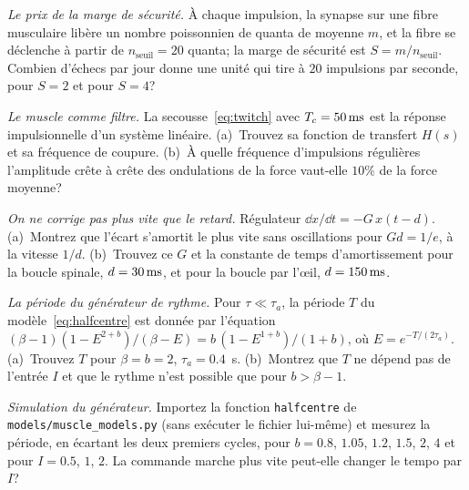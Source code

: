 \begin{exercise}[\lvlA]
\label{ex:13:2}
\emph{Le prix de la marge de sécurité.} À chaque impulsion, la synapse sur une fibre musculaire libère un nombre poissonnien de quanta de moyenne $m$, et la fibre se déclenche à partir de $n_{\text{seuil}}=20$ quanta; la marge de sécurité est $S=m/n_{\text{seuil}}$. Combien d'échecs par jour donne une unité qui tire à $20$ impulsions par seconde, pour $S=2$ et pour $S=4$?
\end{exercise}

\begin{exercise}[\lvlB]
\label{ex:13:3}
\emph{Le muscle comme filtre.} La secousse~\eqref{eq:twitch} avec $T_c=50\,\text{ms}$ est la réponse impulsionnelle d'un système linéaire. (a)~Trouvez sa fonction de transfert $H(s)$ et sa fréquence de coupure. (b)~À quelle fréquence d'impulsions régulières l'amplitude crête à crête des ondulations de la force vaut-elle $10\%$ de la force moyenne?
\end{exercise}

\begin{exercise}[\lvlB]
\label{ex:13:4}
\emph{On ne corrige pas plus vite que le retard.} Régulateur $\dd x/\dd t=-G\,x(t-d)$. (a)~Montrez que l'écart s'amortit le plus vite sans oscillations pour $Gd=1/e$, à la vitesse $1/d$. (b)~Trouvez ce $G$ et la constante de temps d'amortissement pour la boucle spinale, $d=30\,\text{ms}$, et pour la boucle par l'œil, $d=150\,\text{ms}$.
\end{exercise}

\begin{exercise}[\lvlB]
\label{ex:13:5}
\emph{La période du générateur de rythme.} Pour $\tau\ll\tau_a$, la période $T$ du modèle~\eqref{eq:halfcentre} est donnée par l'équation $(\beta-1)(1-E^{2+b})/(\beta-E)=b\,(1-E^{1+b})/(1+b)$, où $E=e^{-T/(2\tau_a)}$. (a)~Trouvez $T$ pour $\beta=b=2$, $\tau_a=0.4$~s. (b)~Montrez que $T$ ne dépend pas de l'entrée $I$ et que le rythme n'est possible que pour $b>\beta-1$.
\end{exercise}

\begin{exercise}[\lvlB]
\label{ex:13:6}
\emph{Simulation du générateur.} Importez la fonction \texttt{halfcentre} de \texttt{models/\allowbreak muscle\_models.py} (sans exécuter le fichier lui-même) et mesurez la période, en écartant les deux premiers cycles, pour $b=0.8$, $1.05$, $1.2$, $1.5$, $2$, $4$ et pour $I=0.5$, $1$, $2$. La commande \og marche plus vite\fg{} peut-elle changer le tempo par $I$?
\end{exercise}

